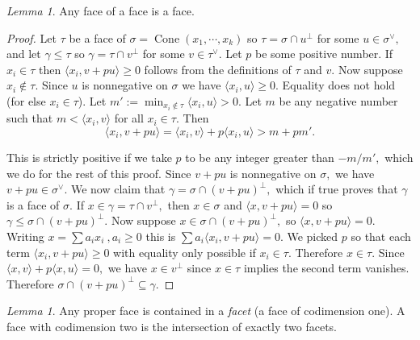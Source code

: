 \documentclass[BSc]{usydthesis}
\numberwithin{equation}{chapter}
\theoremstyle{remark}
\newtheorem{Lemma}[equation]{Lemma}
\newcommand{\V}{\vee}
\DeclareMathOperator{\Cone}{Cone}
\begin{document}
\begin{Lemma} Any face of a face is a face.
\end{Lemma}
\begin{proof} Let $\tau$ be a face of $\sigma= \Cone(x_1, \cdots, x_k)$ so $\tau = \sigma \cap u^{\perp}$ for some $u\in \sigma^{\V},$ and let $\gamma \leq \tau$ so $\gamma = \tau \cap v^{\perp}$ for some $v\in \tau^{\V}.$ Let $p$ be some positive number. If $x_i \in \tau$ then $\langle x_i, v+pu \rangle \geq 0$ follows from the definitions of $\tau$ and $v.$ Now suppose $x_i \notin \tau.$ Since $u$ is nonnegative on $\sigma$ we have $\langle x_i, u \rangle \geq 0.$ Equality does not hold (for else $x_i \in \tau$). Let $ m' := \min_{x_i \notin \tau } \langle x_i, u \rangle > 0.$ Let $m$ be any negative number such that $m < \langle x_i , v \rangle$ for all $x_i \in \tau.$ Then $$ \langle x_i , v+pu \rangle = \langle x_i, v \rangle + p \langle x_i, u \rangle > m + pm'.$$

This is strictly positive if we take $p$ to be any integer greater than $-m/m',$ which we do for the rest of this proof. Since $v+pu$ is nonnegative on $\sigma,$ we have $v+pu \in \sigma^{\V}.$ We now claim that $\gamma = \sigma \cap (v+pu)^{\perp},$ which if true proves that $\gamma$ is a face of $\sigma.$ If $x\in \gamma= \tau \cap v^{\perp},$ then $x\in \sigma$ and $\langle x, v+pu \rangle =0$ so $\gamma \leq \sigma \cap (v+pu)^{\perp}.$ Now suppose $x\in \sigma \cap (v+pu)^{\perp},$ so $\langle x, v+pu \rangle=0.$ Writing $x = \sum a_i x_i \ , a_i \geq 0$ this is $\sum a_i \langle x_i , v+pu \rangle =0.$ We picked $p$ so that each term $\langle x_i, v+pu \rangle \geq 0$ with equality only possible if $x_i \in \tau.$ Therefore $x\in \tau.$ Since $\langle x, v \rangle + p \langle x, u \rangle =0,$ we have $x\in v^{\perp}$ since $x\in \tau$ implies the second term vanishes. Therefore $\sigma \cap (v+pu)^{\perp} \subseteq \gamma.$
\end{proof}

\begin{Lemma} \label{facet1} Any proper face is contained in a {\em facet} (a face of codimension one). A face with codimension two is the intersection of exactly two facets.
\end{Lemma}
\end{document}
